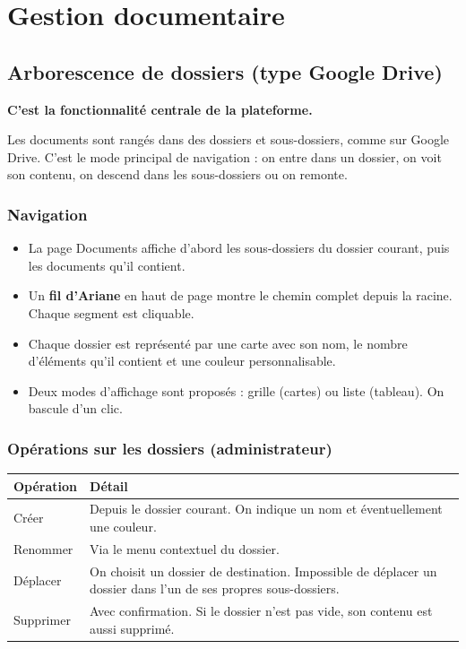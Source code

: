 \documentclass[a4paper,12pt,french]{article}
\begin{document}

\section{Gestion documentaire}

\subsection{Arborescence de dossiers (type Google Drive)}

\textcolor{accentgreen}{\textbf{C'est la fonctionnalité centrale de la plateforme.}}

Les documents sont rangés dans des dossiers et sous-dossiers, comme sur Google Drive. C'est le mode principal de navigation : on entre dans un dossier, on voit son contenu, on descend dans les sous-dossiers ou on remonte.

\subsubsection{Navigation}

\begin{itemize}[leftmargin=1.5em]
  \item La page Documents affiche d'abord les sous-dossiers du dossier courant, puis les documents qu'il contient.
  \item Un \textbf{fil d'Ariane} en haut de page montre le chemin complet depuis la racine. Chaque segment est cliquable.
  \item Chaque dossier est représenté par une carte avec son nom, le nombre d'éléments qu'il contient et une couleur personnalisable.
  \item Deux modes d'affichage sont proposés : grille (cartes) ou liste (tableau). On bascule d'un clic.
\end{itemize}

\subsubsection{Opérations sur les dossiers (administrateur)}

\begin{tabularx}{\textwidth}{l X}
\toprule
\textbf{Opération} & \textbf{Détail} \\
\midrule
Créer & Depuis le dossier courant. On indique un nom et éventuellement une couleur. \\
\addlinespace
Renommer & Via le menu contextuel du dossier. \\
\addlinespace
Déplacer & On choisit un dossier de destination. Impossible de déplacer un dossier dans l'un de ses propres sous-dossiers. \\
\addlinespace
Supprimer & Avec confirmation. Si le dossier n'est pas vide, son contenu est aussi supprimé. \\
\bottomrule
\end{tabularx}
\end{document}
